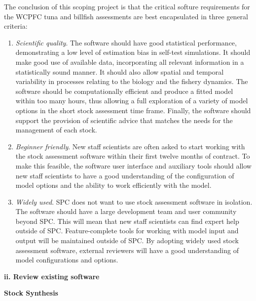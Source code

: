 \documentclass{SCreport}
\begin{document}
The conclusion of this scoping project is that the critical softure requirements
for the WCPFC tuna and billfish assessments are best encapsulated in three
general criteria:

\begin{enumerate}
  \item \textit{Scientific quality}. The software should have good statistical
  performance, demonstrating a low level of estimation bias in self-test
  simulations. It should make good use of available data, incorporating all
  relevant information in a statistically sound manner. It should also allow
  spatial and temporal variability in processes relating to the biology and the
  fishery dynamics. The software should be computationally efficient and produce
  a fitted model within too many hours, thus allowing a full exploration of a
  variety of model options in the short stock assessment time frame. Finally,
  the software should support the provision of scientific advice that matches
  the needs for the management of each stock.
  \item \textit{Beginner friendly}. New staff scientists are often asked to
  start working with the stock assessment software within their first twelve
  months of contract. To make this feasible, the software user interface and
  auxiliary tools should allow new staff scientists to have a good understanding
  of the configuration of model options and the ability to work efficiently with
  the model.
  \item \textit{Widely used}. SPC does not want to use stock assessment software
  in isolation. The software should have a large development team and user
  community beyond SPC. This will mean that new staff scientists can find expert
  help outside of SPC. Feature-complete tools for working with model input and
  output will be maintained outside of SPC. By adopting widely used stock
  assessment software, external reviewers will have a good understanding of
  model configurations and options.
\end{enumerate}

\vspace{2ex}

\textbf{ii. Review existing software}

\vspace{1ex}

\textbf{Stock Synthesis}
\end{document}
